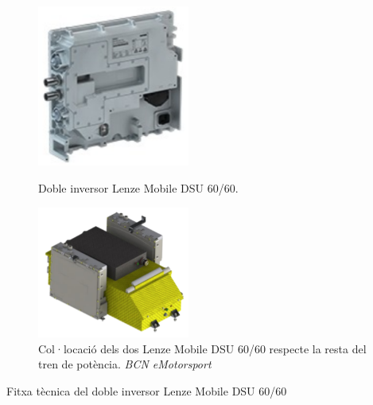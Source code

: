 {{        \begin{figure}[!htb]
            \centering
            \begin{minipage}[c]{7cm}
                \centering
                \captionsetup{justification=centering}
                \includegraphics[width=5cm]
                { img/2_formula_student/inverter.png }
                \caption{ Doble inversor Lenze Mobile DSU 60/60. }
            \end{minipage} \hfil
            \begin{minipage}[c]{7cm}
                \centering
                \captionsetup{justification=centering}
                \includegraphics[width=5cm]
                { img/2_formula_student/inverter2.png } 
                \caption[ Col·locació dels Lenze Mobile ]
                { 
                    Col·locació dels dos Lenze Mobile DSU 60/60 respecte la
                    resta del tren de potència. \emph{BCN eMotorsport}
                }
            \end{minipage} \hfil
        \end{figure}

        \begin{table}[!htb]
            \caption{ Fitxa tècnica del doble inversor Lenze Mobile DSU 60/60 }
            \centering
            \renewcommand{\arraystretch}{1.3}
            \tablefirsthead{}
            \tablehead{}
            \tabletail{}
            \tablelasttail{}
        

\end{table}}}
